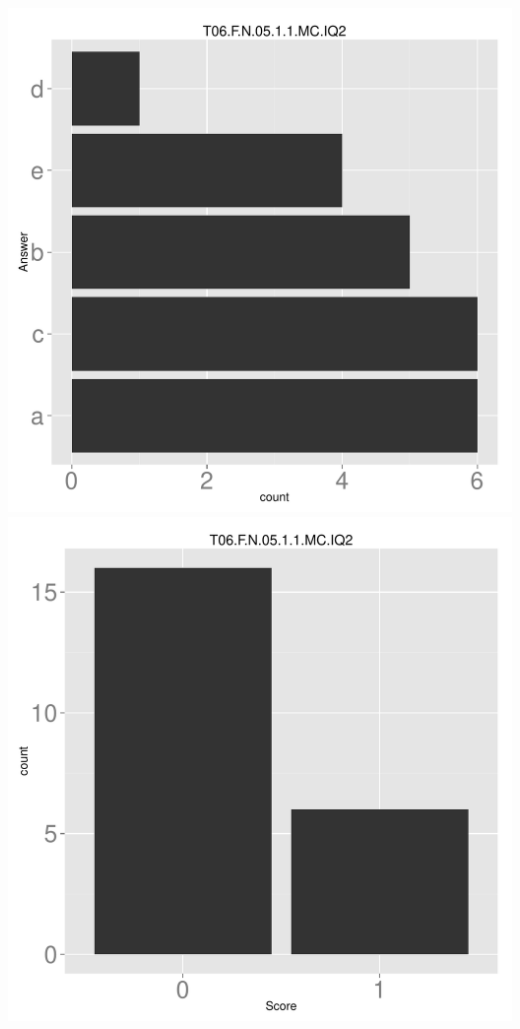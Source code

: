 \documentclass[12pt,nohyper]{tufte-handout}\usepackage[]{graphicx}\usepackage[]{color}
\begin{document}
\begin{center} \includegraphics[width=.45\linewidth]{Topic06_52_answer} \includegraphics[width=.45\linewidth]{Topic06_52_score} \end{center} 
\end{document}
